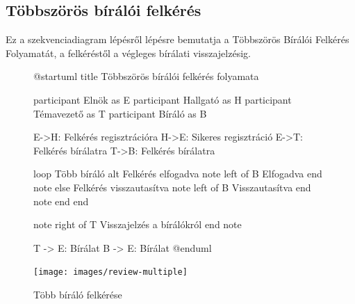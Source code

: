\documentclass[a4paper,12pt]{article}
\begin{document}
\subsection{Többszörös bírálói felkérés}

Ez a szekvenciadiagram lépésről lépésre bemutatja a Többszörös Bírálói Felkérés Folyamatát, a felkéréstől a végleges bírálati visszajelzésig.

\begin{figure}
\centering
\begin{plantuml}
@startuml
title Többszörös bírálói felkérés folyamata

participant Elnök as E
participant Hallgató as H
participant Témavezető as T
participant Bíráló as B

E->H: Felkérés regisztrációra
H->E: Sikeres regisztráció
E->T: Felkérés bírálatra
T->B: Felkérés bírálatra

loop Több bíráló
	alt Felkérés elfogadva
		note left of B 
		Elfogadva
		end note
	else Felkérés visszautasítva
		note left of B 
		Visszautasítva
		end note
	end
end

note right of T 
Visszajelzés a bírálókról
end note

T -> E: Bírálat
B -> E: Bírálat
@enduml
\end{plantuml}
\texttt{[image: images/review-multiple]}
\caption{Több bíráló felkérése}
\label{fig:review-multiple}
\end{figure}
\end{document}
